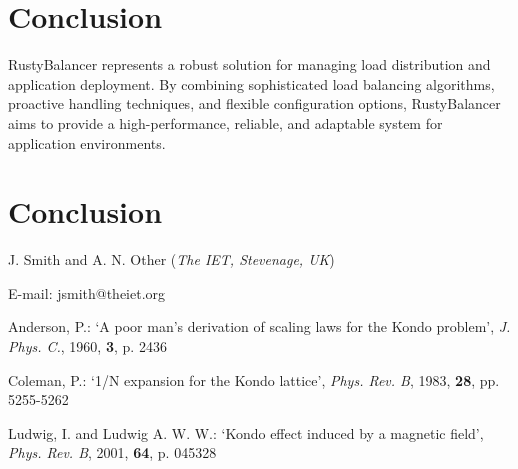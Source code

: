 \documentclass[twocolumn]{el-author}
\begin{document}
\section{Conclusion}

RustyBalancer represents a robust solution for managing load distribution and application deployment.
By combining sophisticated load balancing algorithms, proactive handling techniques, and flexible configuration options, RustyBalancer aims to provide a high-performance, reliable, and adaptable system for application environments.



\section{Conclusion}
\vskip3pt

\noindent J. Smith and A. N. Other (\textit{The IET, Stevenage, UK})
\vskip3pt

\noindent E-mail: jsmith@theiet.org

\begin{thebibliography}{}

Anderson, P.: `A poor man's derivation of scaling laws for the Kondo problem', \textit{J. Phys. C.}, 1960, \textbf{3}, p. 2436

Coleman, P.: `1/N expansion for the Kondo lattice', \textit{Phys. Rev. B}, 1983, \textbf{28}, pp. 5255-5262

Ludwig, I. and Ludwig A. W. W.: `Kondo effect induced by a magnetic field', \textit{Phys. Rev. B}, 2001, \textbf{64}, p. 045328

\end{thebibliography}
\end{document}
